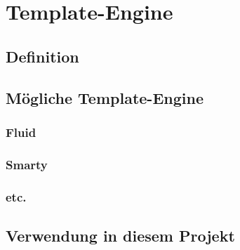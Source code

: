 \chapter{Template-Engine}

\section{Definition}

\section{Mögliche Template-Engine}

\subsection{Fluid}

\subsection{Smarty}

\subsection{etc.}

\section{Verwendung in diesem Projekt}

